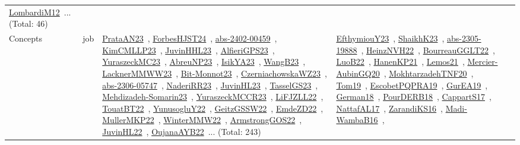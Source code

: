 {\begin{longtable}{lp{3cm}>{\raggedright\arraybackslash}p{6cm}>{\raggedright\arraybackslash}p{6cm}>{\raggedright\arraybackslash}p{8cm}}
\href{works/LombardiM12.pdf}{LombardiM12}~\cite{LombardiM12}... (Total: 46)\\
Concepts & job & \href{works/PrataAN23.pdf}{PrataAN23}~\cite{PrataAN23}, \href{works/ForbesHJST24.pdf}{ForbesHJST24}~\cite{ForbesHJST24}, \href{works/abs-2402-00459.pdf}{abs-2402-00459}~\cite{abs-2402-00459}, \href{works/KimCMLLP23.pdf}{KimCMLLP23}~\cite{KimCMLLP23}, \href{works/JuvinHHL23.pdf}{JuvinHHL23}~\cite{JuvinHHL23}, \href{works/AlfieriGPS23.pdf}{AlfieriGPS23}~\cite{AlfieriGPS23}, \href{works/YuraszeckMC23.pdf}{YuraszeckMC23}~\cite{YuraszeckMC23}, \href{works/AbreuNP23.pdf}{AbreuNP23}~\cite{AbreuNP23}, \href{works/IsikYA23.pdf}{IsikYA23}~\cite{IsikYA23}, \href{works/WangB23.pdf}{WangB23}~\cite{WangB23}, \href{works/LacknerMMWW23.pdf}{LacknerMMWW23}~\cite{LacknerMMWW23}, \href{works/Bit-Monnot23.pdf}{Bit-Monnot23}~\cite{Bit-Monnot23}, \href{works/CzerniachowskaWZ23.pdf}{CzerniachowskaWZ23}~\cite{CzerniachowskaWZ23}, \href{works/abs-2306-05747.pdf}{abs-2306-05747}~\cite{abs-2306-05747}, \href{works/NaderiRR23.pdf}{NaderiRR23}~\cite{NaderiRR23}, \href{works/JuvinHL23.pdf}{JuvinHL23}~\cite{JuvinHL23}, \href{works/TasselGS23.pdf}{TasselGS23}~\cite{TasselGS23}, \href{works/Mehdizadeh-Somarin23.pdf}{Mehdizadeh-Somarin23}~\cite{Mehdizadeh-Somarin23}, \href{works/YuraszeckMCCR23.pdf}{YuraszeckMCCR23}~\cite{YuraszeckMCCR23}, \href{works/LiFJZLL22.pdf}{LiFJZLL22}~\cite{LiFJZLL22}, \href{works/TouatBT22.pdf}{TouatBT22}~\cite{TouatBT22}, \href{works/YunusogluY22.pdf}{YunusogluY22}~\cite{YunusogluY22}, \href{works/GeitzGSSW22.pdf}{GeitzGSSW22}~\cite{GeitzGSSW22}, \href{works/EmdeZD22.pdf}{EmdeZD22}~\cite{EmdeZD22}, \href{works/MullerMKP22.pdf}{MullerMKP22}~\cite{MullerMKP22}, \href{works/WinterMMW22.pdf}{WinterMMW22}~\cite{WinterMMW22}, \href{works/ArmstrongGOS22.pdf}{ArmstrongGOS22}~\cite{ArmstrongGOS22}, \href{works/JuvinHL22.pdf}{JuvinHL22}~\cite{JuvinHL22}, \href{works/OujanaAYB22.pdf}{OujanaAYB22}~\cite{OujanaAYB22}... (Total: 243) & \href{works/EfthymiouY23.pdf}{EfthymiouY23}~\cite{EfthymiouY23}, \href{works/ShaikhK23.pdf}{ShaikhK23}~\cite{ShaikhK23}, \href{works/abs-2305-19888.pdf}{abs-2305-19888}~\cite{abs-2305-19888}, \href{works/HeinzNVH22.pdf}{HeinzNVH22}~\cite{HeinzNVH22}, \href{works/BourreauGGLT22.pdf}{BourreauGGLT22}~\cite{BourreauGGLT22}, \href{works/LuoB22.pdf}{LuoB22}~\cite{LuoB22}, \href{works/HanenKP21.pdf}{HanenKP21}~\cite{HanenKP21}, \href{works/Lemos21.pdf}{Lemos21}~\cite{Lemos21}, \href{works/Mercier-AubinGQ20.pdf}{Mercier-AubinGQ20}~\cite{Mercier-AubinGQ20}, \href{works/MokhtarzadehTNF20.pdf}{MokhtarzadehTNF20}~\cite{MokhtarzadehTNF20}, \href{works/Tom19.pdf}{Tom19}~\cite{Tom19}, \href{works/EscobetPQPRA19.pdf}{EscobetPQPRA19}~\cite{EscobetPQPRA19}, \href{works/GurEA19.pdf}{GurEA19}~\cite{GurEA19}, \href{works/German18.pdf}{German18}~\cite{German18}, \href{works/PourDERB18.pdf}{PourDERB18}~\cite{PourDERB18}, \href{works/CappartS17.pdf}{CappartS17}~\cite{CappartS17}, \href{works/NattafAL17.pdf}{NattafAL17}~\cite{NattafAL17}, \href{works/ZarandiKS16.pdf}{ZarandiKS16}~\cite{ZarandiKS16}, \href{works/Madi-WambaB16.pdf}{Madi-WambaB16}~\cite{Madi-WambaB16}, 
\end{longtable}}
